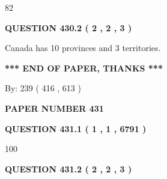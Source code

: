 \documentclass[12pt]{article}
\begin{document}
82
 
 
  
\vspace{0.2in}
  
{\textbf{\Large{QUESTION
430.2 
 ( 2 , 2 , 3 )
}}}
  
  
 
 
\noindent{}
 
 
Canada has 10  provinces and 3 territories.
 
 
 
 
   
   
 \vspace{0.2in}
 
   
   
   
   
\vspace{1.0in} 
{\textbf{\large{ *** END OF PAPER, THANKS *** }}} 
   
   
\hspace{1.0in} By: 
 239 ( 416 ,  613 )
   
   
   
   
\newpage 
\setcounter{page}{ 
   431001 } 
   
   
   
   
 {\textbf{ \Large{ PAPER NUMBER  431  }}}
   
   
\vspace{0.2in}
   
   
   
   
   
   
 \vspace{0.2in}
 
 
 
 
   
   
  
\vspace{0.2in}
  
{\textbf{\Large{QUESTION
431.1 
 ( 1 , 1 , 6791 )
}}}
  
  
 
 
\noindent{}

100
 
 
  
\vspace{0.2in}
  
{\textbf{\Large{QUESTION
431.2 
 ( 2 , 2 , 3 )
}}}
  
\end{document}

